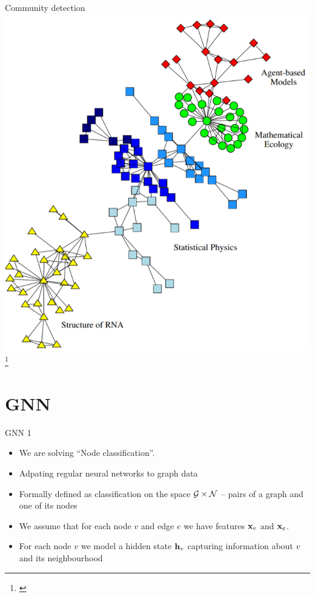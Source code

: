 \documentclass[10pt]{beamer}
\newcommand{\mathvec}{\ensuremath{\mathbf}}
\newcommand{\mathspace}{\ensuremath{\mathcal}}
\begin{document}
\begin{frame}{Community detection}
	\centering
	\includegraphics[width=0.5\pagewidth]{images/community-detection.png}\footnote{\cite{girvan_community_2002}}
\end{frame}

\section{GNN}

\begin{frame}{GNN 1}
	\begin{itemize}
		\item We are solving \enquote{Node classification}.
		\item Adpating regular neural networks to graph data
		\item Formally defined as classification on the space \( \mathspace{G} \times \mathspace{N} \) -- pairs of a graph and one of its nodes
		\item We assume that for each node \( v \) and edge \( e \) we have features \( \mathvec{x}_v \) and \( \mathvec{x}_e \).
		\item For each node \( v \) we model a hidden state \( \mathvec{h}_v \) capturing information about \( v \) and its neighbourhood
	\end{itemize}
\end{frame}
\end{document}
